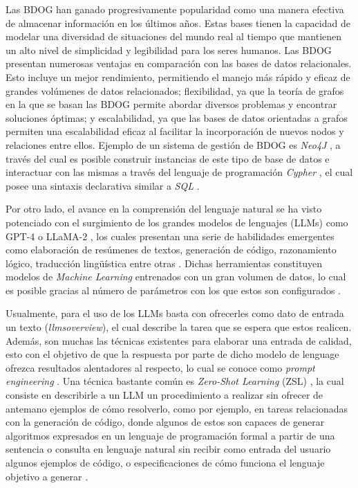 Las BDOG han ganado progresivamente popularidad como una manera efectiva de almacenar información en los últimos años. Estas bases tienen la capacidad de modelar una diversidad de situaciones del mundo real al tiempo que mantienen un alto nivel de simplicidad y legibilidad para los seres humanos. Las BDOG presentan numerosas ventajas en comparación con las bases de datos relacionales. Esto incluye un mejor rendimiento, permitiendo el manejo más rápido y eficaz de grandes volúmenes de datos relacionados; flexibilidad, ya que la teoría de grafos en la que se basan las BDOG permite abordar diversos problemas y encontrar soluciones óptimas; y escalabilidad, ya que las bases de datos orientadas a grafos permiten una escalabilidad eficaz al facilitar la incorporación de nuevos nodos y relaciones entre ellos. Ejemplo de un sistema de gestión de BDOG es \textit{Neo4J} \cite{neo4j}, a través del cual es posible construir instancias de este tipo de base de datos e interactuar con las mismas a través del lenguaje de programación \textit{Cypher} \cite{cypher}, el cual posee una sintaxis declarativa similar a \textit{SQL} \cite{sqllang}.

Por otro lado, el avance en la comprensión del lenguaje natural se ha visto potenciado con el surgimiento de los grandes modelos de lenguajes (LLMs) \cite{llmsoverview} como GPT-4 \cite{gpt4} o LLaMA-2 \cite{llama2}, los cuales presentan una serie de habilidades emergentes como elaboración de resúmenes de textos, generación de código, razonamiento lógico, traducción lingüística entre otras \cite{llmsskills}. Dichas herramientas constituyen modelos de \textit{Machine Learning} entrenados con un gran volumen de datos, lo cual es posible gracias al número de parámetros con los que estos son configurados \cite{llmsoverview}. 

Usualmente, para el uso de los LLMs basta con ofrecerles como dato de entrada un texto (\textit{llmsoverview}), el cual describe la tarea que se espera que estos realicen. Además, son muchas las técnicas existentes para elaborar una entrada de calidad, esto con el objetivo de que la respuesta por parte de dicho modelo de lenguage ofrezca resultados alentadores al respecto, lo cual se conoce como \textit{prompt engineering} \cite{prompengineering}. Una técnica bastante común es \textit{Zero-Shot Learning} (ZSL) \cite{zeroshotlearning}, la cual consiste en describirle a un LLM un procedimiento a realizar sin ofrecer de antemano ejemplos de cómo resolverlo, como por ejemplo, en tareas relacionadas con la generación de código, donde algunos de estos son capaces de generar algoritmos expresados en un lenguaje de programación formal a partir de una sentencia o consulta en lenguaje natural sin recibir como entrada del usuario algunos ejemplos de código, o especificaciones de cómo funciona el lenguaje objetivo a generar \cite{text2code1} \cite{text2code2}. 

